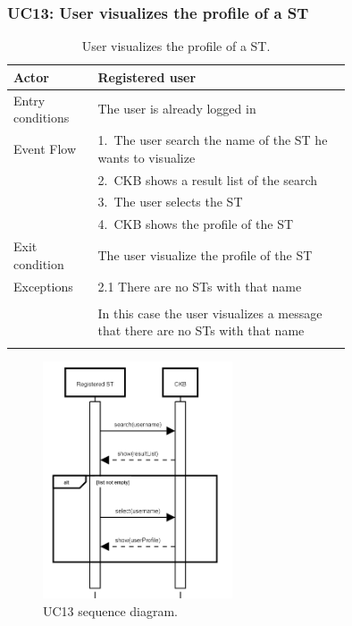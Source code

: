 \subsubsection*{UC13: User visualizes the profile of a ST}
\begin{center}
  \begin{longtable}{l|p{0.75\linewidth}}
    \hline
    Actor & Registered user \\
    \hline
    Entry conditions & The user is already logged in \\
    \hline
    Event Flow & 1.\ The user search the name of the ST he wants to visualize \\
    & 2.\ CKB shows a result list of the search \\  
    & 3.\ The user selects the ST \\
    & 4.\ CKB shows the profile of the ST \\
    \hline
    Exit condition &  The user visualize the profile of the ST \\
    \hline
    Exceptions & 2.1 There are no STs with that name \\ \\
    & In this case the user visualizes a message that there are no STs with that name \\
    \hline
    \caption{User visualizes the profile of a ST.}
    \label{tab: User_visualizes_ST_profile}
  \end{longtable}

  \begin{figure} [H]
    \begin{center}
        \includegraphics[width=0.50\textwidth,height=\textheight,keepaspectratio]{Images/SequenceDiagrams/UC13.png}
        \caption{UC13 sequence diagram.}
        \label{fig: UC13_sequence_diagram}
    \end{center}
  \end{figure}
\end{center}

